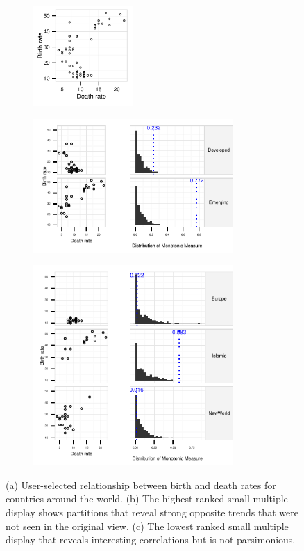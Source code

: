 \begin{figure}
 \centering 
	 \begin{subfigure}{1.5in}
		\includegraphics[width=1.5in]{images/DEATH_RT-BIRTH_RT.pdf}
		  \caption{}
		 \label{fig:informative_all}
	\end{subfigure}
	\begin{subfigure}{3in}
		\includegraphics[width=3in]{images/9_95670214716782-GDP.pdf}
		  \caption{}
		 \label{fig:informative}
	 \end{subfigure}
	 \begin{subfigure}{3in}
		\includegraphics[width=3in]{images/3_97529346797117-GROUP.pdf}
		  \caption{}
		 \label{fig:not_informative}
	 \end{subfigure}
	  \caption{(a) User-selected relationship between birth and death rates for countries around the world. (b) The highest ranked small multiple display shows partitions that reveal strong opposite trends that were not seen in the original view. (c) The lowest ranked small multiple display that reveals interesting correlations but is not parsimonious.}
\end{figure}

